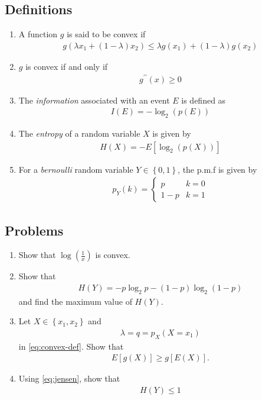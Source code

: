 \documentclass[journal,12pt,onecolumn]{IEEEtran}
\renewcommand\thesection{\arabic{section}}
\renewcommand\thesubsection{\thesection.\arabic{subsection}}
\providecommand{\sbrak}[1]{\ensuremath{{}\left[#1\right]}}
\providecommand{\brak}[1]{\ensuremath{\left(#1\right)}}
\providecommand{\cbrak}[1]{\ensuremath{\left\{#1\right\}}}
\theoremstyle{remark}
\numberwithin{equation}{section}
\begin{document}
\subsection{Definitions}
\begin{enumerate}[label=\arabic*.,ref=\thesubsection.\theenumi]
\item A function $g$ is said to be convex if 
\begin{align}
	g\brak{\lambda x_1 + \brak{1-\lambda}x_2} \le \lambda g(x_1)+\brak{1-\lambda} g(x_2)
	\label{eq:convex-def}
\end{align}
\item $g$ is convex if and only if
\begin{align}
	g^{\prime\prime}(x) \ge 0
\end{align}
\item The {\em information} associated with an event $E$ is defined as
\begin{align}
	I\brak{E} = -\log_2\brak{p(E)}
\end{align}
\item The {\em entropy} of a random variable $X$ is given by 
\begin{align}
	H\brak{X} = -E\sbrak{\log_2\brak{p\brak{X}}}
\end{align}
\item For a {\em bernoulli} random variable $Y\in\cbrak{0,1}$, the p.m.f is given by 
\begin{align}
	p_Y(k) = 
	\begin{cases}
		p & k = 0
		\\
		1-p & k = 1
	\end{cases}
\end{align}

\end{enumerate}
\subsection{Problems}
\begin{enumerate}[label=\arabic*.,ref=\thesubsection.\theenumi]
\item Show that $\log\brak{\frac{1}{x}}$  is convex.
\item Show that
\begin{align}
	H(Y) = -p\log_2p - \brak{1-p} \log_2\brak{1-p}
\end{align}
		and find the maximum value of $H(Y)$.
	\item Let $X \in \cbrak{x_1,x_2}$ and
\begin{align}
	\lambda = q = p_X(X = x_1)
\end{align}
in
	\eqref{eq:convex-def}.
		Show that
\begin{align}
	E\sbrak{g(X)} \ge g\sbrak{E\brak{X}}
	\label{eq:jensen}.
\end{align}
\item Using 
	\eqref{eq:jensen},
show that 
\begin{align}
	H(Y) \le 1
\end{align}
 \end{enumerate}
%
\end{document}
